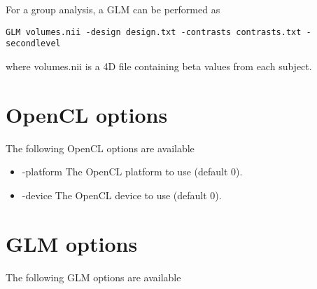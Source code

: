 \noindent For a group analysis, a GLM can be performed as
\begin{verbatim}
GLM volumes.nii -design design.txt -contrasts contrasts.txt -secondlevel
\end{verbatim}
where volumes.nii is a 4D file containing beta values from each subject.



\section{OpenCL options}

The following OpenCL options are available

\begin{itemize}

\item -platform
\newline \newline The OpenCL platform to use (default 0).

\item -device
\newline \newline The OpenCL device to use (default 0).

\end{itemize}

\section{GLM options}

The following GLM options are available

